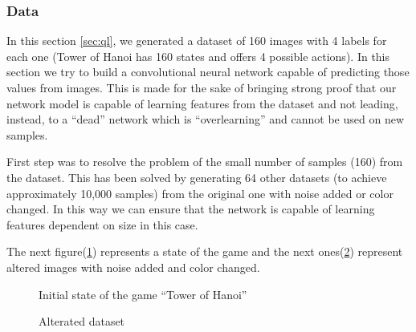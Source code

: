 \subsubsection{Data}

In this section \ref{sec:ql}, we generated a dataset of 160 images with 4 labels for each one (Tower of Hanoi has 160 states and offers 4 possible actions). In this section we try to build a convolutional neural network capable of predicting those values from images. This is made for the sake of bringing strong proof that our network model is capable of learning features from the dataset and not leading, instead, to a ``dead'' network which is ``overlearning'' and cannot be used on new samples.

First step was to resolve the problem of the small number of samples (160) from the dataset. This has been solved by generating 64 other datasets (to achieve approximately 10,000 samples) from the original one with noise added or color changed. In this way we can ensure that the network is capable of learning features dependent on size in this case.

The next figure(\ref{fig:155}) represents a state of the game and the next ones(\ref{fig:states}) represent altered images with noise added and color changed.

\begin{figure}[h]
	\begin{center}
		\caption{Initial state of the game ``Tower of Hanoi''} \label{fig:155}
    \end{center}
\end{figure}

\begin{figure}[h]
	\begin{center}
		\caption{Alterated dataset} \label{fig:states}
    \end{center}
\end{figure}


